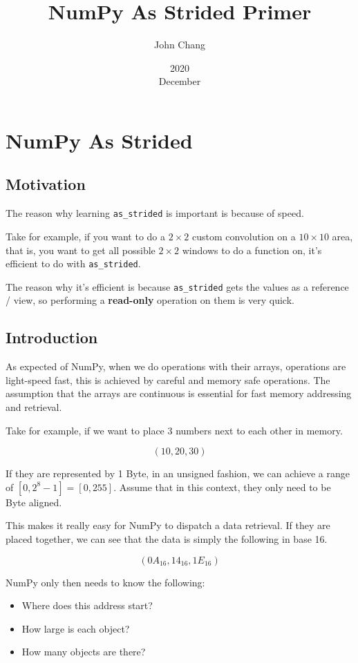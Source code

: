\documentclass[oneside, 12pt]{report}
\title{NumPy As Strided Primer}
\date{2020\\ December}
\author{John Chang}
\begin{document}
\maketitle
\newpage

\chapter{NumPy As Strided}

\section{Motivation}

The reason why learning \verb+as_strided+ is important is because of speed.

Take for example, if you want to do a $2 \times 2$ custom convolution on a $10 \times 10$ area, that is, you want to get all possible $2 \times 2$ windows to do a function on, it's efficient to do with \verb+as_strided+.

The reason why it's efficient is because \verb+as_strided+ gets the values as a reference / view, so performing a \textbf{read-only} operation on them is very quick.

\section{Introduction}

As expected of NumPy, when we do operations with their arrays, operations are light-speed fast, this is achieved by careful and memory safe operations. The assumption that the arrays are continuous is essential for fast memory addressing and retrieval.

Take for example, if we want to place 3 numbers next to each other in memory.

$$(10, 20, 30)$$

If they are represented by 1 Byte, in an unsigned fashion, we can achieve a range of $[0, 2^{8}-1] = [0, 255]$. Assume that in this context, they only need to be Byte aligned.

This makes it really easy for NumPy to dispatch a data retrieval. If they are placed together, we can see that the data is simply the following in base 16.

$$(0A_{16}, 14_{16}, 1E_{16})$$

NumPy only then needs to know the following:

\begin{itemize}
\item{Where does this address start?}
\item{How large is each object?}
\item{How many objects are there?}
\end{itemize}
\end{document}
